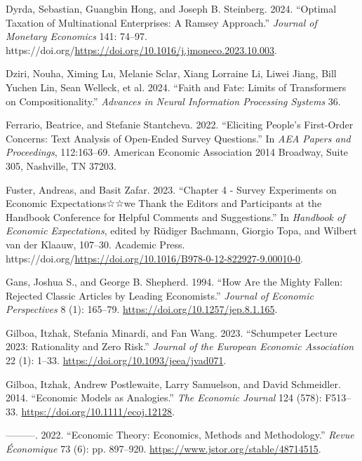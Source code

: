 \documentclass[
]{article}
\newlength{\cslhangindent}
\newenvironment{CSLReferences}[2] %
 {\begin{list}{}{%
  \setlength{\itemindent}{0pt}
  \setlength{\leftmargin}{0pt}
  \setlength{\parsep}{0pt}
  \ifodd #1
   \setlength{\leftmargin}{\cslhangindent}
   \setlength{\itemindent}{-1\cslhangindent}
  \fi
  \setlength{\itemsep}{#2\baselineskip}}}
 {\end{list}}
\begin{document}
\begin{CSLReferences}{1}{0}
Dyrda, Sebastian, Guangbin Hong, and Joseph B. Steinberg. 2024.
{``Optimal Taxation of Multinational Enterprises: A Ramsey Approach.''}
\emph{Journal of Monetary Economics} 141: 74--97.
https://doi.org/\url{https://doi.org/10.1016/j.jmoneco.2023.10.003}.

Dziri, Nouha, Ximing Lu, Melanie Sclar, Xiang Lorraine Li, Liwei Jiang,
Bill Yuchen Lin, Sean Welleck, et al. 2024. {``Faith and Fate: Limits of
Transformers on Compositionality.''} \emph{Advances in Neural
Information Processing Systems} 36.

Ferrario, Beatrice, and Stefanie Stantcheva. 2022. {``Eliciting People's
First-Order Concerns: Text Analysis of Open-Ended Survey Questions.''}
In \emph{AEA Papers and Proceedings}, 112:163--69. American Economic
Association 2014 Broadway, Suite 305, Nashville, TN 37203.

Fuster, Andreas, and Basit Zafar. 2023. {``Chapter 4 - Survey
Experiments on Economic Expectations☆☆we Thank the Editors and
Participants at the Handbook Conference for Helpful Comments and
Suggestions.''} In \emph{Handbook of Economic Expectations}, edited by
Rüdiger Bachmann, Giorgio Topa, and Wilbert van der Klaauw, 107--30.
Academic Press.
https://doi.org/\url{https://doi.org/10.1016/B978-0-12-822927-9.00010-0}.

Gans, Joshua S., and George B. Shepherd. 1994. {``How Are the Mighty
Fallen: Rejected Classic Articles by Leading Economists.''}
\emph{Journal of Economic Perspectives} 8 (1): 165--79.
\url{https://doi.org/10.1257/jep.8.1.165}.

Gilboa, Itzhak, Stefania Minardi, and Fan Wang. 2023. {``{Schumpeter
Lecture 2023: Rationality and Zero Risk}.''} \emph{Journal of the
European Economic Association} 22 (1): 1--33.
\url{https://doi.org/10.1093/jeea/jvad071}.

Gilboa, Itzhak, Andrew Postlewaite, Larry Samuelson, and David
Schmeidler. 2014. {``{Economic Models as Analogies}.''} \emph{The
Economic Journal} 124 (578): F513--33.
\url{https://doi.org/10.1111/ecoj.12128}.

---------. 2022. {``Economic Theory: Economics, Methods and
Methodology.''} \emph{Revue Économique} 73 (6): pp. 897--920.
\url{https://www.jstor.org/stable/48714515}.


\end{CSLReferences}
\end{document}
